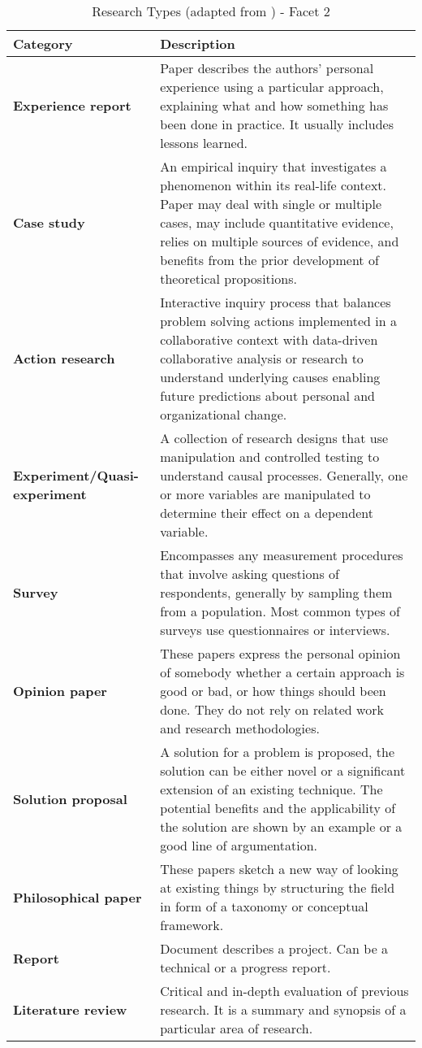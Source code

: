 \begin{table*}
	\centering
	\caption {Research Types (adapted from \cite{Petersen}) - Facet 2}  
    {\begin{tabular}{ p{1.2in} | p{4.7in} }
			\bf Category & \bf Description \\
			\hline
			\bf Experience report & Paper describes the authors' personal experience using a particular approach, explaining what and how something has been done in practice. It usually includes lessons learned. \\
			\bf Case study & An empirical inquiry that investigates a phenomenon within its real-life context. Paper may deal with single or multiple cases, may include quantitative evidence, relies on multiple sources of evidence, and benefits from the prior development of theoretical propositions. \\
			\bf Action research & Interactive inquiry process that balances problem solving actions implemented in a collaborative context with data-driven collaborative analysis or research to understand underlying causes enabling future predictions about personal and organizational change. \\
			\bf Experiment/Quasi-experiment & A collection of research designs that use manipulation and controlled testing to understand causal processes. Generally, one or more variables are manipulated to determine their effect on a dependent variable. \\
			\bf Survey & Encompasses any measurement procedures that involve asking questions of respondents, generally by sampling them from a population. Most common types of surveys use questionnaires or interviews. \\
			\bf Opinion paper & These papers express the personal opinion of somebody whether a certain approach is good or bad, or how things should been done. They do not rely on related work and research methodologies. \\
			\bf Solution proposal & A solution for a problem is proposed, the solution can be either novel or a significant extension of an existing technique. The potential benefits and the applicability of the solution are shown by an example or a good line of argumentation. \\
			\bf Philosophical paper & These papers sketch a new way of looking at existing things by structuring the field in form of a taxonomy or conceptual framework. \\
			\bf Report & Document describes a project. Can be a technical or a progress report. \\		
			\bf Literature review & Critical and in-depth evaluation of previous research. It is a summary and synopsis of a particular area of research. \\		
	\end{tabular}}
	\label{tab:researchType}
\end{table*}
